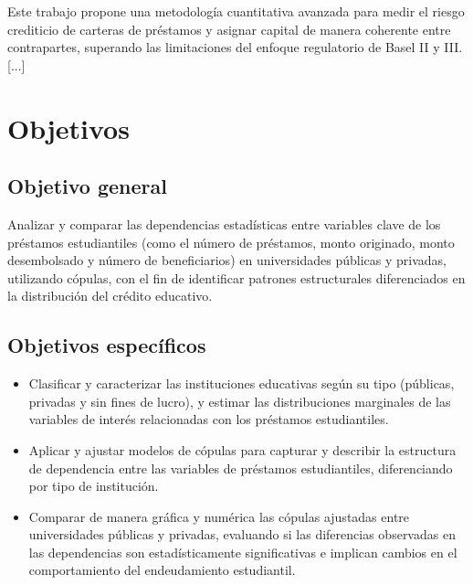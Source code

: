 \documentclass[11pt,a4paper]{article}
\begin{document}
Este trabajo propone una metodología cuantitativa avanzada para medir el riesgo crediticio de carteras de préstamos y asignar capital de manera coherente entre contrapartes, superando las limitaciones del enfoque regulatorio de Basel II y III. [...]


\section{Objetivos}

\subsection*{Objetivo general}
Analizar y comparar las dependencias estadísticas entre variables clave de los préstamos estudiantiles (como el número de préstamos, monto originado, monto desembolsado y número de beneficiarios) en universidades públicas y privadas, utilizando cópulas, con el fin de identificar patrones estructurales diferenciados en la distribución del crédito educativo.

\subsection*{Objetivos específicos}
\begin{itemize}
  \item Clasificar y caracterizar las instituciones educativas según su tipo (públicas, privadas y sin fines de lucro), y estimar las distribuciones marginales de las variables de interés relacionadas con los préstamos estudiantiles.
  \item Aplicar y ajustar modelos de cópulas para capturar y describir la estructura de dependencia entre las variables de préstamos estudiantiles, diferenciando por tipo de institución.
  \item Comparar de manera gráfica y numérica las cópulas ajustadas entre universidades públicas y privadas, evaluando si las diferencias observadas en las dependencias son estadísticamente significativas e implican cambios en el comportamiento del endeudamiento estudiantil.
\end{itemize}

\printbibliography
\end{document}
